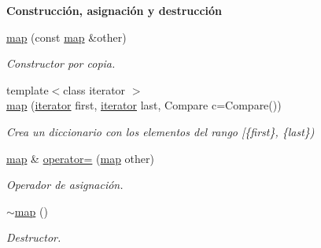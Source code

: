 \begin{Indent}{\bf \-Construcción, asignación y destrucción}
\begin{DoxyCompactItemize}
\hyperlink{classaed2_1_1map_a7a77950a3d8e637bfa7cf5dcd904f257}{map} (const \hyperlink{classaed2_1_1map}{map} \&other)
\begin{DoxyCompactList}\small\item\em \-Constructor por copia. \end{DoxyCompactList}\item 
{\footnotesize template$<$class iterator $>$ }\\\hyperlink{classaed2_1_1map_a5d336f3248572beb56be383dcc95cfeb}{map} (\hyperlink{classaed2_1_1map_1_1iterator}{iterator} first, \hyperlink{classaed2_1_1map_1_1iterator}{iterator} last, \-Compare c=\-Compare())
\begin{DoxyCompactList}\small\item\em \-Crea un diccionario con los elementos del rango \mbox{[}\{first\}, \{last\}) \end{DoxyCompactList}\item 
\hyperlink{classaed2_1_1map}{map} \& \hyperlink{classaed2_1_1map_ac606d334809066929522964d45e76317}{operator=} (\hyperlink{classaed2_1_1map}{map} other)
\begin{DoxyCompactList}\small\item\em \-Operador de asignación. \end{DoxyCompactList}\item 
\hyperlink{classaed2_1_1map_ab22c9a85c2dadbc286cd30e97069a8e6}{$\sim$map} ()
\begin{DoxyCompactList}\small\item\em \-Destructor. \end{DoxyCompactList}\end{DoxyCompactItemize}
\end{Indent}
